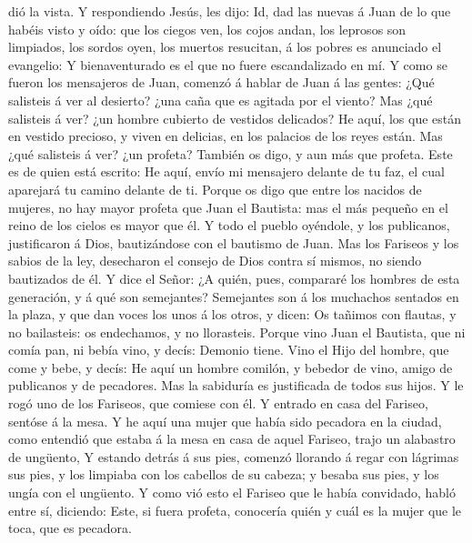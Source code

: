 dió la vista.  Y respondiendo Jesús, les dijo: Id, dad
las nuevas á Juan de lo que habéis visto y oído: que los ciegos ven, los
cojos andan, los leprosos son limpiados, los sordos oyen, los muertos
resucitan, á los pobres es anunciado el evangelio:  Y
bienaventurado es el que no fuere escandalizado en mí.  Y
como se fueron los mensajeros de Juan, comenzó á hablar de Juan á las
gentes: ¿Qué salisteis á ver al desierto? ¿una caña que es agitada por
el viento?  Mas ¿qué salisteis á ver? ¿un hombre cubierto
de vestidos delicados? He aquí, los que están en vestido precioso, y
viven en delicias, en los palacios de los reyes están. 
Mas ¿qué salisteis á ver? ¿un profeta? También os digo, y aun más que
profeta.  Este es de quien está escrito: He aquí, envío
mi mensajero delante de tu faz, el cual aparejará tu camino delante de
ti.  Porque os digo que entre los nacidos de mujeres, no
hay mayor profeta que Juan el Bautista: mas el más pequeño en el reino
de los cielos es mayor que él.  Y todo el pueblo
oyéndole, y los publicanos, justificaron á Dios, bautizándose con el
bautismo de Juan.  Mas los Fariseos y los sabios de la
ley, desecharon el consejo de Dios contra sí mismos, no siendo
bautizados de él.  Y dice el Señor: ¿A quién, pues,
compararé los hombres de esta generación, y á qué son semejantes?
 Semejantes son á los muchachos sentados en la plaza, y
que dan voces los unos á los otros, y dicen: Os tañimos con flautas, y
no bailasteis: os endechamos, y no llorasteis.  Porque
vino Juan el Bautista, que ni comía pan, ni bebía vino, y decís: Demonio
tiene.  Vino el Hijo del hombre, que come y bebe, y
decís: He aquí un hombre comilón, y bebedor de vino, amigo de publicanos
y de pecadores.  Mas la sabiduría es justificada de todos
sus hijos.  Y le rogó uno de los Fariseos, que comiese
con él. Y entrado en casa del Fariseo, sentóse á la mesa.
 Y he aquí una mujer que había sido pecadora en la
ciudad, como entendió que estaba á la mesa en casa de aquel Fariseo,
trajo un alabastro de ungüento,  Y estando detrás á sus
pies, comenzó llorando á regar con lágrimas sus pies, y los limpiaba con
los cabellos de su cabeza; y besaba sus pies, y los ungía con el
ungüento.  Y como vió esto el Fariseo que le había
convidado, habló entre sí, diciendo: Este, si fuera profeta, conocería
quién y cuál es la mujer que le toca, que es pecadora. 
